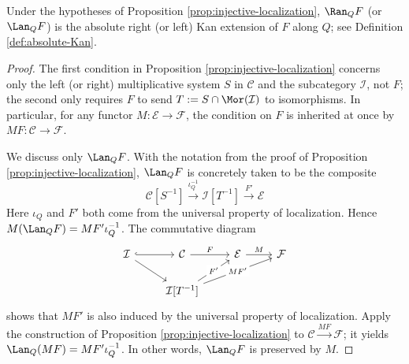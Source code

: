\begin{proposition}\label{prop:localization-functor-abs}
	Under the hypotheses of Proposition \ref{prop:injective-localization},
	$\Ran_QF$ (or $\Lan_QF$) is the absolute right (or left) Kan extension of
	$F$ along $Q$; see Definition \ref{def:absolute-Kan}.
\end{proposition}
\begin{proof}
	The first condition in Proposition \ref{prop:injective-localization}
	concerns only the left (or right) multiplicative system $S$ in
	$\mathcal{C}$ and the subcategory $\mathcal{I}$, not $F$; the second only
	requires $F$ to send $T:=S\cap\Mor(\mathcal{I})$ to isomorphisms. In
	particular, for any functor $M:\mathcal{E}\to\mathcal{F}$, the condition
	on $F$ is inherited at once by $MF:\mathcal{C}\to\mathcal{F}$.

	We discuss only $\Lan_QF$. With the notation from the proof of Proposition
	\ref{prop:injective-localization}, $\Lan_QF$ is concretely taken to be the
	composite
	\[ \mathcal{C}[S^{-1}] \xrightarrow{\iota_Q^{-1}} \mathcal{I}[T^{-1}] \xrightarrow{F'} \mathcal{E} \]
	Here $\iota_Q$ and $F'$ both come from the universal property of
	localization. Hence $M(\Lan_QF)=MF'\iota_Q^{-1}$. The commutative diagram
	\[\begin{tikzcd}
		\mathcal{I} \arrow[hookrightarrow, r] \arrow[rd] & \mathcal{C} \arrow[r, "F"] & \mathcal{E} \arrow[r, "M"] & \mathcal{F} \\
		& \mathcal{I}[T^{-1}] \arrow[ru, "{F'}" description] \arrow[rru, "{MF'}" description] & &
	\end{tikzcd}\]
	shows that $MF'$ is also induced by the universal property of localization.
	Apply the construction of Proposition \ref{prop:injective-localization} to
	$\mathcal{C}\xrightarrow{MF}\mathcal{F}$; it yields
	$\Lan_Q(MF)=MF'\iota_Q^{-1}$. In other words, $\Lan_QF$ is preserved by
	$M$.
\end{proof}
